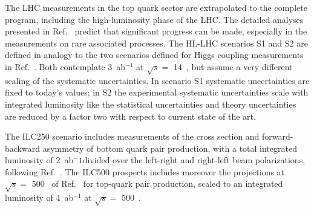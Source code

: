 The LHC measurements in the top quark sector are extrapolated to the complete program,
including the high-luminosity phase of the LHC. The detailed analyses presented in
Ref.~\cite{Azzi:2019yne} predict that significant progress can be made, especially
in the measurements on rare associated processes.
The HL-LHC scenarios S1 and S2 are defined in analogy to the two scenarios
defined for Higgs coupling measurements in Ref.~\cite{Cepeda:2019klc}. 
Both contemplate 3~ab$^{-1}${} at $\sqrt{s}=$ 14~\TeV, but assume a very different
scaling of the systematic uncertainties. In scenario S1 systematic uncertainties 
are fixed to today's values;
in S2 the experimental systematic uncertainties scale with integrated luminosity
like the statistical uncertainties and theory uncertainties are reduced by a 
factor two with respect to current state of the art. 

The ILC250 scenario includes
measurements of the cross section and forward-backward asymmetry of bottom quark 
pair production, with a total integrated luminosity of 2~ab$^-1$divided over the
left-right and right-left beam polarizations, following Ref.~\cite{Bilokin:2017lco}.
The ILC500 prospects includes moreover the projections at $\sqrt{s}=$ 500~\GeV{} of
Ref.~\cite{Durieux:2018tev} for top-quark pair production, scaled to an integrated
luminosity of 4~ab$^{-1}${} at $\sqrt{s}=$ 500~\GeV{}.

